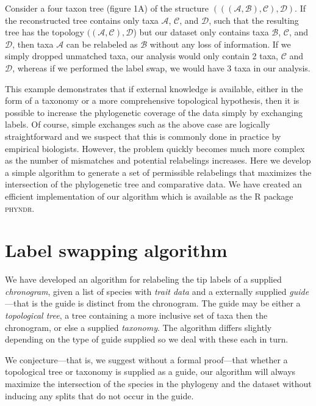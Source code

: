 \documentclass[a4paper,11pt]{article}
\begin{document}
Consider a four taxon tree (figure 1A) of the structure $(((\mathcal{A},\mathcal{B}),\mathcal{C}),\mathcal{D})$. If the reconstructed tree contains only taxa $\mathcal{A}$, $\mathcal{C}$, and $\mathcal{D}$, such that the resulting tree has the topology $((\mathcal{A},\mathcal{C}),\mathcal{D}$) but our dataset only contains taxa $\mathcal{B}$, $\mathcal{C}$, and $\mathcal{D}$, then taxa $\mathcal{A}$ can be relabeled as  $\mathcal{B}$  without any loss of information. If we simply dropped unmatched taxa, our analysis would only contain 2 taxa, $\mathcal{C}$ and $\mathcal{D}$, whereas if we performed the label swap, we would have 3 taxa in our analysis.

This example demonstrates that if external knowledge is available, either in the form of a taxonomy or a more comprehensive topological hypothesis, then it is possible to increase the phylogenetic coverage of the data simply by exchanging labels. Of course, simple exchanges such as the above case are logically straightforward and we suspect that this is commonly done in practice by empirical biologists. However, the problem quickly becomes much more complex as the number of mismatches and potential relabelings increases. Here we develop a simple algorithm to generate a set of permissible relabelings that maximizes the intersection of the phylogenetic tree and comparative data. We have created an efficient implementation of our algorithm which is available as the R package \textsc{phyndr}. 

\section{Label swapping algorithm}

We have developed an algorithm for relabeling the tip labels of a supplied \emph{chronogram}, given a list of species with \emph{trait data} and a externally supplied \emph{guide}---that is the guide is distinct from the chronogram. The guide may be either a \emph{topological tree}, a tree containing a more inclusive set of taxa then the chronogram, or else a supplied \emph{taxonomy}. The algorithm differs slightly depending on the type of guide supplied so we deal with these each in turn.

We conjecture---that is, we suggest without a formal proof---that whether a topological tree or taxonomy is supplied as a guide, our algorithm will always maximize the intersection of the species in the phylogeny and the dataset without inducing any splits that do not occur in the guide.
\end{document}
